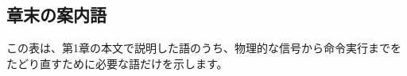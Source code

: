 \newcommand{\ChapterOneSupplementalTerms}{%
\begin{description}
  \item[\term{電気信号}] 電圧や電流の変化によって情報を運ぶ物理的な信号です。
  \item[\term{負数}] 0より小さい数です。
  \item[\term{符号ビット}] 符号付き数の正負の解釈に関係するビットです。
  \item[\term{ASCII}] 英数字や制御文字へ番号を割り当てる文字コードです。
  \item[\term{浮動小数点}] 符号、指数、仮数に分けて実数を近似表現する方式です。
  \item[\term{IEEE 754}] 浮動小数点の形式と演算を定める国際規格です。
  \item[\term{MOSFET}] 電界によって電流を制御する代表的なトランジスタです。
  \item[\term{スイッチ}] 条件に応じて電気的な導通を切り替える素子の抽象化です。
  \item[\term{NOR}] ORの結果を反転する論理ゲートです。
  \item[\term{多ビット加算}] 桁上がりを隣の桁へ渡しながら複数桁を加える処理です。
  \item[\term{データバス}] CPU、メモリ、周辺装置の間で値を運ぶ信号線群です。
  \item[\term{メインメモリ}] 実行中の命令とデータを置く主記憶です。
  \item[\term{ノイマン型}] 命令とデータを同じ記憶へ置く計算機構成です。
  \item[\term{命令レジスタ}] 現在デコードまたは実行する命令を保持するレジスタです。
\end{description}%
}

\subsection*{章末の案内語}

この表は、第1章の本文で説明した語のうち、物理的な信号から命令実行までをたどり直すために必要な語だけを示します。

